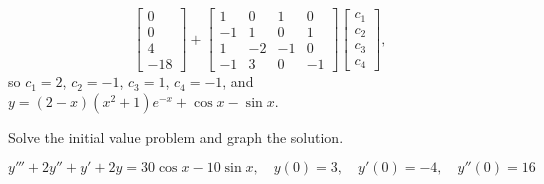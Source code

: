 \documentclass{ximera}
\begin{document}
\begin{problem}
\begin{solution}
$$\left[\begin{array}{r}
0\\0\\4\\-18
\end{array}\right]+
\left[\begin{array}{rrrr}1&0&1&0\\-1&1&0&1\\
1&-2&-1&0\\-1&3&0&-1\end{array}\right]
\left[\begin{array}{c}
c_1\\c_2\\c_3\\c_4
\end{array}\right],
$$
so $c_1=2$, $c_2=-1$, $c_3=1$, $c_4=-1$, and
$y=(2-x)(x^2+1)e^{-x}+\cos x-\sin x$.
\end{solution}
\end{problem}

\begin{problem}\label{exer:9.3.73}  Solve the initial value problem and graph the solution.

$y'''+2y''+y'+2y=30\cos x-10\sin x,
\quad y(0)=3,\quad y'(0)=-4,\quad y''(0)=16$
\end{problem}
\end{document}
